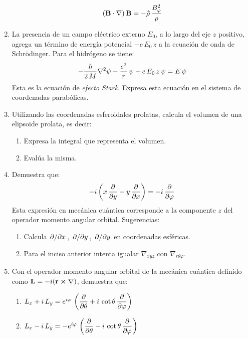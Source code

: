 \begin{enumerate}
\begin{align*}
\vb{(B \cdot \nabla}) \, \vb{B} = - \vu{\rho} \, \dfrac{B_{\varphi}^{2}}{\rho}
\end{align*}
\item La presencia de un campo eléctrico externo $E_{0}$, a lo largo del eje $z$ positivo, agrega un término de energía potencial $-e \, E_{0} \, z$ a la ecuación de onda de Schrödinger. Para el hidrógeno se tiene:
\begin{align*}
-\dfrac{\hbar}{2 \, M} \laplacian{\psi} - \dfrac{e^{2}}{r} \, \psi - e \, E_{0} \, z \, \psi = E \, \psi
\end{align*}
Esta es la ecuación de \emph{efecto Stark}. Expresa esta ecuación en el sistema de coordenadas parabólicas.
\item Utilizando las coordenadas esferoidales prolatas, calcula el volumen de una elipsoide prolata, es decir:
\begin{enumerate}
\item Expresa la integral que representa el volumen.
\item Evalúa la misma.
\end{enumerate}
\item Demuestra que:
\begin{align*}
- i \left( x \, \pdv{y} - y \, \pdv{x} \right) = - i \, \pdv{\varphi}
\end{align*}
Esta expresión en mecánica cuántica corresponde a la componente $z$ del operador momento angular orbital.
Sugerencias: 
\begin{enumerate}[label=\alph*)]
\item Calcula $\pdv*{x}$, $\pdv*{y}$, $\pdv*{y}$ en coordenadas esféricas.
\item Para el inciso anterior intenta igualar  $\nabla_{xyz}$ con $\nabla_{r \theta \varphi}$.
\end{enumerate}
\item \label{operador_momento_angular} Con el operador momento angular orbital de la mecánica cuántica definido como $\vb{L} = - i (\vb{r} \cp \nabla )$, demuestra que:
\begin{enumerate}
\item $L_{x} + i \, L_{y} = e^{i \varphi} \, \left( \displaystyle \pdv{\theta} + i \, \cot \theta \, \pdv{\varphi} \right)$
\item $L_{x} - i \, L_{y} = -e^{i \varphi} \, \left( \displaystyle \pdv{\theta} - i \, \cot \theta \, \pdv{\varphi} \right)$
\end{enumerate}

\end{enumerate}
